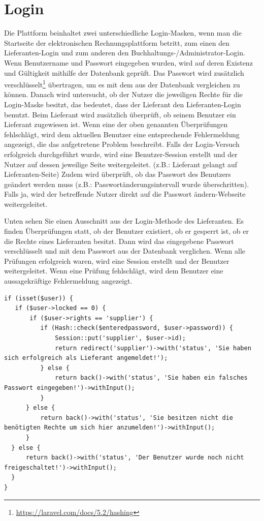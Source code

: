 \section{Login}
Die Plattform beinhaltet zwei unterschiedliche Login-Masken, wenn man die Startseite der elektronischen Rechnungsplattform betritt, zum einen den Lieferanten-Login und zum anderen den Buchhaltungs-/Administrator-Login. Wenn Benutzername und Passwort eingegeben wurden, wird auf deren Existenz und Gültigkeit mithilfe der Datenbank geprüft. Das Passwort wird zusätzlich verschlüsselt\footnote{\url{https://laravel.com/docs/5.2/hashing}} übertragen, um es mit dem aus der Datenbank vergleichen zu können. Danach wird untersucht, ob der Nutzer die jeweiligen Rechte für die Login-Maske besitzt, das bedeutet, dass der Lieferant den Lieferanten-Login benutzt. Beim Lieferant wird zusätzlich überprüft, ob seinem Benutzer ein Lieferant zugewiesen ist. Wenn eine der oben genannten Überprüfungen fehlschlägt, wird dem aktuellen Benutzer eine entsprechende Fehlermeldung angezeigt, die das aufgetretene Problem beschreibt. Falls der Login-Versuch erfolgreich durchgeführt wurde, wird eine Benutzer-Session erstellt und der Nutzer auf dessen jeweilige Seite weitergeleitet. (z.B.: Lieferant gelangt auf Lieferanten-Seite) Zudem wird überprüft, ob das Passwort des Benutzers geändert werden muss (z.B.: Passwortänderungsintervall wurde überschritten). Falls ja, wird der betreffende Nutzer direkt auf die Passwort ändern-Webseite weitergeleitet.

\newpage
Unten sehen Sie einen Ausschnitt aus der Login-Methode des Lieferanten. Es finden Überprüfungen statt, ob der Benutzer existiert, ob er gesperrt ist, ob er die Rechte eines Lieferanten besitzt. Dann wird das eingegebene Passwort verschlüsselt und mit dem Passwort aus der Datenbank verglichen. Wenn alle Prüfungen erfolgreich waren, wird eine Session erstellt und der Benutzer weitergeleitet. Wenn eine Prüfung fehlschlägt, wird dem Benutzer eine aussagekräftige Fehlermeldung angezeigt.

\begin{lstlisting}
if (isset($user)) {
   if ($user->locked == 0) {
	   if ($user->rights == 'supplier') {
		  if (Hash::check($enteredpassword, $user->password)) {
			  Session::put('supplier', $user->id);
			  return redirect('supplier')->with('status', 'Sie haben sich erfolgreich als Lieferant angemeldet!');
		  } else {
			  return back()->with('status', 'Sie haben ein falsches Passwort eingegeben!')->withInput();
		  }
	  } else {
		  return back()->with('status', 'Sie besitzen nicht die benötigten Rechte um sich hier anzumelden!')->withInput();
	  }
  } else {
	  return back()->with('status', 'Der Benutzer wurde noch nicht freigeschaltet!')->withInput();
  }
}
\end{lstlisting}

